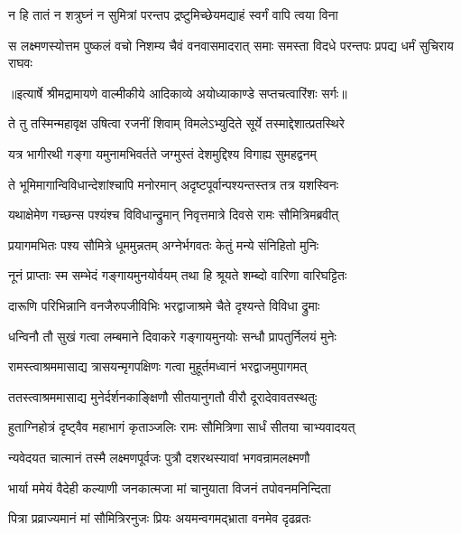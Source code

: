 \twolineshloka
{न हि तातं न शत्रुघ्नं न सुमित्रां परन्तप}
{द्रष्टुमिच्छेयमद्याहं स्वर्गं वापि त्वया विना} %

\fourlineindentedshloka
{स लक्ष्मणस्योत्तम पुष्कलं वचो}
{निशम्य चैवं वनवासमादरात्}
{समाः समस्ता विदधे परन्तपः}
{प्रपद्य धर्मं सुचिराय राघवः} %


{॥इत्यार्षे श्रीमद्रामायणे वाल्मीकीये आदिकाव्ये अयोध्याकाण्डे सप्तचत्वारिंशः सर्गः॥}


\twolineshloka
{ते तु तस्मिन्महावृक्ष उषित्वा रजनीं शिवाम्}
{विमलेऽभ्युदिते सूर्ये तस्माद्देशात्प्रतस्थिरे} %

\twolineshloka
{यत्र भागीरथी गङ्गा यमुनामभिवर्तते}
{जग्मुस्तं देशमुद्दिश्य विगाह्य सुमहद्वनम्} %

\twolineshloka
{ते भूमिमागान्विविधान्देशांश्चापि मनोरमान्}
{अदृष्टपूर्वान्पश्यन्तस्तत्र तत्र यशस्विनः} %

\twolineshloka
{यथाक्षेमेण गच्छन्स पश्यंश्च विविधान्द्रुमान्}
{निवृत्तमात्रे दिवसे रामः सौमित्रिमब्रवीत्} %

\twolineshloka
{प्रयागमभितः पश्य सौमित्रे धूममुन्नतम्}
{अग्नेर्भगवतः केतुं मन्ये संनिहितो मुनिः} %

\twolineshloka
{नूनं प्राप्ताः स्म सम्भेदं गङ्गायमुनयोर्वयम्}
{तथा हि श्रूयते शम्ब्दो वारिणा वारिघट्टितः} %

\twolineshloka
{दारूणि परिभिन्नानि वनजैरुपजीविभिः}
{भरद्वाजाश्रमे चैते दृश्यन्ते विविधा द्रुमाः} %

\twolineshloka
{धन्विनौ तौ सुखं गत्वा लम्बमाने दिवाकरे}
{गङ्गायमुनयोः सन्धौ प्रापतुर्निलयं मुनेः} %

\twolineshloka
{रामस्त्वाश्रममासाद्य त्रासयन्मृगपक्षिणः}
{गत्वा मुहूर्तमध्वानं भरद्वाजमुपागमत्} %

\twolineshloka
{ततस्त्वाश्रममासाद्य मुनेर्दर्शनकाङ्क्षिणौ}
{सीतयानुगतौ वीरौ दूरादेवावतस्थतुः} %

\twolineshloka
{हुताग्निहोत्रं दृष्ट्वैव महाभागं कृताञ्जलिः}
{रामः सौमित्रिणा सार्धं सीतया चाभ्यवादयत्} %

\twolineshloka
{न्यवेदयत चात्मानं तस्मै लक्ष्मणपूर्वजः}
{पुत्रौ दशरथस्यावां भगवन्रामलक्ष्मणौ} %

\twolineshloka
{भार्या ममेयं वैदेही कल्याणी जनकात्मजा}
{मां चानुयाता विजनं तपोवनमनिन्दिता} %

\twolineshloka
{पित्रा प्रव्राज्यमानं मां सौमित्रिरनुजः प्रियः}
{अयमन्वगमद्भ्राता वनमेव दृढव्रतः} %

